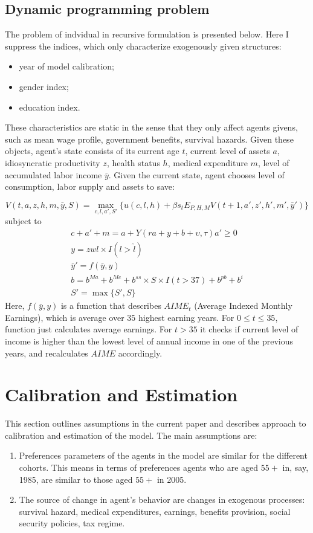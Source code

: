 \documentclass[
10pt, %
a4paper, %
oneside, %
headinclude,footinclude, %
BCOR5mm, %
]{scrartcl}
\begin{document}
\subsection{Dynamic programming problem}
The problem of indvidual in recursive formulation is presented below. Here I suppress the indices, which only characterize exogenously given structures:
\begin{itemize}
\item year of model calibration;
\item gender index;
\item education index.
\end{itemize}
These characteristics are static in the sense that they only affect agents givens, such as mean wage profile, government benefits, survival hazards. Given these objects, agent's state consists of its current age $t$, current level of assets $a$, idiosyncratic productivity $z$, health status $h$, medical expenditure $m$, level of accumulated labor income $\bar{y}$. Given the current state, agent chooses level of consumption, labor supply and assets to save:

\begin{equation}
V(t,a,z,h,m,\bar{y},S) = \max_{c,l,a',S'}\{u(c,l,h) + \beta s_t  E_{P,H,M} V(t+1,a',z',h',m',\bar{y}')\}
\end{equation}
subject to 
\begin{eqnarray*}
c + a' +m = a+Y(ra+y+b+\upsilon,\tau)
a'\ge0 \\
y = z w l \times I(l>\hat{l}) \\
\bar{y}' = f(\bar{y},y)\\
b = b^{Ma}+b^{Mc} + b^{ss}\times S\times I(t>37)+b^{pb}+b^{i} \\
S' = \max\{S',S\}
\end{eqnarray*}
Here, $f(\bar{y},y)$ is a function that describes $AIME_t$ (Average Indexed Monthly Earnings), which is average over $35$ highest earning years. For $0\le t \le 35$, function just calculates average earnings. For $t>35$ it checks if current level of income is higher than the lowest level of annual income in one of the previous years, and recalculates $AIME$ accordingly.  

\section{Calibration and Estimation}
This section outlines assumptions in the current paper and describes approach to calibration and estimation of the model.
The main assumptions are:
\begin{enumerate}
\item Preferences parameters of the agents in the model are similar for the different cohorts. This means in terms of preferences agents who are aged $55+$ in, say, 1985, are similar to those aged $55+$ in 2005.
\item The source of change in agent's behavior are changes in exogenous processes: survival hazard, medical expenditures, earnings, benefits provision, social security policies, tax regime.
\end{enumerate}
\end{document}
